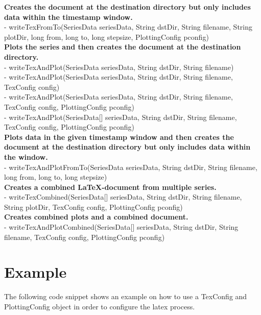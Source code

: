 \textbf{Creates the document at the destination directory but only includes data within the timestamp window.}\\
- writeTexFromTo(SeriesData seriesData, String dstDir, String filename, String plotDir, long from, long to, long stepsize, PlottingConfig pconfig)\\

\textbf{Plots the series and then creates the document at the destination directory.}\\
- writeTexAndPlot(SeriesData seriesData, String dstDir, String filename)\\
- writeTexAndPlot(SeriesData seriesData, String dstDir, String filename, TexConfig config)\\
- writeTexAndPlot(SeriesData seriesData, String dstDir, String filename, TexConfig config, PlottingConfig pconfig)\\
- writeTexAndPlot(SeriesData[] seriesData, String dstDir, String filename, TexConfig config, PlottingConfig pconfig)\\

\textbf{Plots data in the given timestamp window and then creates the document at the destination directory but only includes data within the window.}\\
- writeTexAndPlotFromTo(SeriesData seriesData, String dstDir, String filename, long from, long to, long stepsize)\\

\textbf{Creates a combined LaTeX-document from multiple series.}\\
- writeTexCombined(SeriesData[] seriesData, String dstDir, String filename, String plotDir, TexConfig config, PlottingConfig pconfig)\\

\textbf{Creates combined plots and a combined document.}\\
- writeTexAndPlotCombined(SeriesData[] seriesData, String dstDir, String filename, TexConfig config, PlottingConfig pconfig)\\


\section{Example}
The following code snippet shows an example on how to use a TexConfig and PlottingConfig object in order to configure the latex process.

